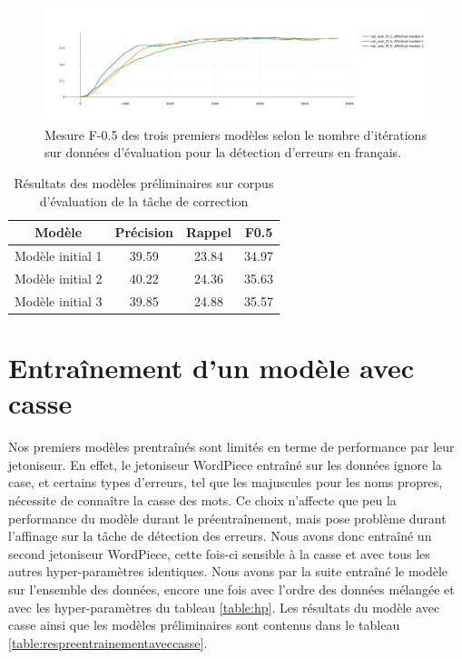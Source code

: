 \documentclass[12pt,twoside,maitrise]{dms}
\theoremstyle{definition}
\numberwithin{equation}{section}
\numberwithin{table}{chapter}
\numberwithin{figure}{chapter}
\begin{document}
\begin{figure}
    \begin{center}
        \includegraphics[width=1.40\textwidth]{figures/3premiersmodelesf05.png}
    \end{center}
    \caption{Mesure F-0.5 des trois premiers modèles selon le nombre d'itérations sur données d'évaluation pour la détection d'erreurs en français.}
    \label{fig:3premiermodeles}
\end{figure}


\begin{table}[h!]
\centering
\begin{tabular}{||c | c | c | c||}
 \hline
    Modèle & Précision & Rappel & F0.5 \\ [0.5ex]
 \hline\hline
    Modèle initial 1  & 39.59 & 23.84 & 34.97 \\
    Modèle initial 2  & 40.22 & 24.36 & 35.63 \\
    Modèle initial 3  & 39.85 & 24.88 & 35.57  \\
 \hline
\end{tabular}
    \caption{Résultats des modèles préliminaires sur corpus d'évaluation de la tâche de correction}
\label{table:premiermodeles}
\end{table}


\section{Entraînement d'un modèle avec casse}

Nos premiers modèles prentraînés sont limités en terme de performance par leur
jetoniseur. En effet, le jetoniseur WordPiece entraîné sur les données ignore
la case, et certains types d'erreurs, tel que les majuscules pour les noms
propres, nécessite de connaître la casse des mots. Ce choix n'affecte que peu
la performance du modèle durant le préentraînement, mais pose problème durant
l'affinage sur la tâche de détection des erreurs. Nous avons donc entraîné un
second jetoniseur WordPiece, cette fois-ci sensible à la casse et avec tous les
autres hyper-paramètres identiques. Nous avons par la suite entraîné le modèle
sur l'ensemble des données, encore une fois avec l'ordre des données mélangée
et avec les hyper-paramètres du tableau \ref{table:hp}. Les résultats du modèle
avec casse ainsi que les modèles préliminaires sont contenus dans le tableau
\ref{table:respreentrainementaveccasse}.
\end{document}
